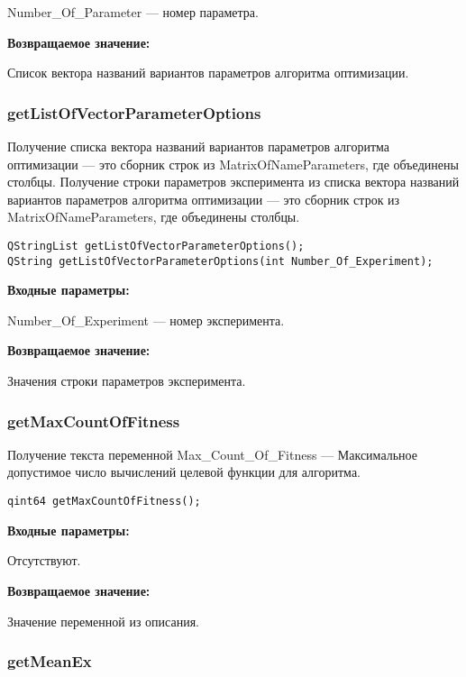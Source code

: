 \documentclass[a4paper,12pt]{article}
\begin{document}
Number\_Of\_Parameter --- номер параметра.

\textbf{Возвращаемое значение:}

Список вектора названий вариантов параметров алгоритма оптимизации.


\subsubsection{getListOfVectorParameterOptions}\label{getListOfVectorParameterOptions}

Получение списка вектора названий вариантов параметров алгоритма оптимизации --- это сборник строк из MatrixOfNameParameters, где объединены столбцы. Получение строки параметров эксперимента из списка вектора названий вариантов параметров алгоритма оптимизации --- это сборник строк из MatrixOfNameParameters, где объединены столбцы.


\begin{lstlisting}[label=code_syntax_getListOfVectorParameterOptions,caption=Синтаксис]
QStringList getListOfVectorParameterOptions();
QString getListOfVectorParameterOptions(int Number_Of_Experiment);
\end{lstlisting}

\textbf{Входные параметры:}

Number\_Of\_Experiment --- номер эксперимента.

\textbf{Возвращаемое значение:}

Значения строки параметров эксперимента.


\subsubsection{getMaxCountOfFitness}\label{getMaxCountOfFitness}

Получение текста переменной  Max\_Count\_Of\_Fitness --- Максимальное допустимое число вычислений целевой функции для алгоритма.


\begin{lstlisting}[label=code_syntax_getMaxCountOfFitness,caption=Синтаксис]
qint64 getMaxCountOfFitness();
\end{lstlisting}

\textbf{Входные параметры:}

Отсутствуют.

\textbf{Возвращаемое значение:}

Значение переменной из описания.


\subsubsection{getMeanEx}\label{getMeanEx}
\end{document}
